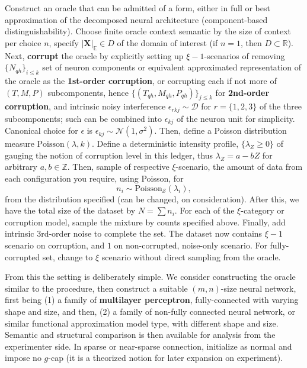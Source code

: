 \begin{definition}
    Construct an oracle that can be admitted of a form, either in full or best approximation of the decomposed neural architecture (component-based distinguishability). Choose finite oracle context semantic by the size of context per choice $n$, specify $|\mathbf{X}|_{\mathbb{E}}\in D$ of the domain of interest (if $n=1$, then $D\subset \mathbb{R}$). Next, \textbf{corrupt} the oracle by explicitly setting up $\xi-1$-scenarios of removing $\{N_{qh}\}_{i\leq k}$ set of neuron components or equivalent approximated representation of the oracle as the \textbf{1st-order corruption}, or corrupting each if not more of $(T,M,P)$ subcomponents, hence $\{(T_{qh},M_{qh},P_{qh})\}_{j \leq k}$ for \textbf{2nd-order corruption}, and intrinsic noisy interference $\epsilon_{rkj}\sim \mathcal{D}$ for $r=\{1,2,3\}$ of the three subcomponents; such can be combined into $\epsilon_{kj}$ of the neuron unit for simplicity. Canonical choice for $\epsilon$ is $\epsilon_{kj}\sim \mathcal{N}(1,\sigma^{2})$. Then, define a Poisson distribution measure $\mathrm{Poisson}(\lambda,k)$. Define a deterministic intensity profile, $\{\lambda_{Z}\geq 0\}$ of gauging the notion of corruption level in this ledger, thus $\lambda_{Z}=a-bZ$ for arbitrary $a,b\in\mathbb{Z}$. Then, sample of respective $\xi$-scenario, the amount of data from each configuration you require, using Poisson, for
    \begin{equation}
        n_{i}\sim\mathrm{Poisson}_{\mathcal{S}}(\lambda_{i}), 
    \end{equation} 
    from the distribution specified (can be changed, on consideration). After this, we have the total size of the dataset by $N=\sum n_{i}$. For each of the $\xi$-category or corruption model, sample the mixture by counts specified above. Finally, add intrinsic 3rd-order noise to complete the set. The dataset now contains $\xi-1$ scenario on corruption, and $1$ on non-corrupted, noise-only scenario. For fully-corrupted set, change to $\xi$ scenario without direct sampling from the oracle.
\end{definition}
From this the setting is deliberately simple. We consider constructing the oracle similar to the procedure, then construct a suitable $(m,n)$-size neural network, first being (1) a family of \textbf{multilayer perceptron}, fully-connected with varying shape and size, and then, (2) a family of non-fully connected neural network, or similar functional approximation model type, with different shape and size. Semantic and structural comparison is then available for analysis from the experimenter side. In sparse or near-sparse connection, initialize as normal and impose no $g$-cap (it is a theorized notion for later expansion on experiment).
